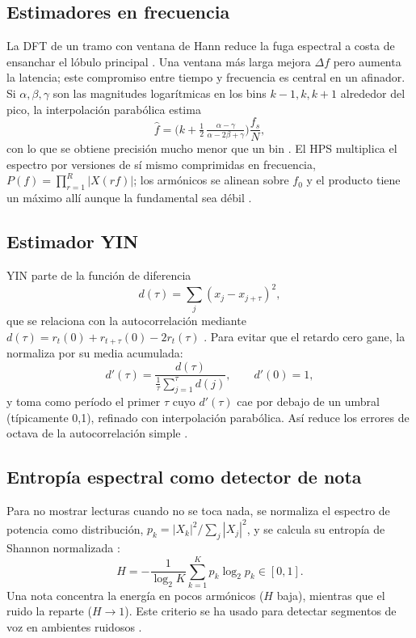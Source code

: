 \documentclass[conference,a4paper]{IEEEtran}
\newcommand{\fo}{f_0}
\begin{document}
\subsection{Estimadores en frecuencia}
La DFT de un tramo con ventana de Hann reduce la fuga espectral a costa de ensanchar el lóbulo principal \parencite{harris1978windows,oppenheim2010discrete}. Una ventana más larga mejora $\Delta f$ pero aumenta la latencia; este compromiso entre tiempo y frecuencia es central en un afinador. Si $\alpha,\beta,\gamma$ son las magnitudes logarítmicas en los bins $k-1,k,k+1$ alrededor del pico, la interpolación parabólica estima
\begin{equation}
\hat f = \Big(k+\tfrac12\,\tfrac{\alpha-\gamma}{\alpha-2\beta+\gamma}\Big)\frac{f_s}{N},
\end{equation}
con lo que se obtiene precisión mucho menor que un bin \parencite{jacobsen2007fast}. El HPS multiplica el espectro por versiones de sí mismo comprimidas en frecuencia, $P(f)=\prod_{r=1}^{R}|X(rf)|$; los armónicos se alinean sobre $\fo$ y el producto tiene un máximo allí aunque la fundamental sea débil \parencite{schroeder1968period,noll1970hps}.

\subsection{Estimador YIN}
YIN parte de la función de diferencia
\begin{equation}
d(\tau)=\sum_{j}(x_j-x_{j+\tau})^2,
\end{equation}
que se relaciona con la autocorrelación mediante $d(\tau)=r_t(0)+r_{t+\tau}(0)-2r_t(\tau)$ \parencite{rabiner1977autocorrelation}. Para evitar que el retardo cero gane, la normaliza por su media acumulada:
\begin{equation}
d'(\tau)=\frac{d(\tau)}{\frac{1}{\tau}\sum_{j=1}^{\tau}d(j)},\qquad d'(0)=1,
\end{equation}
y toma como período el primer $\tau$ cuyo $d'(\tau)$ cae por debajo de un umbral (típicamente 0,1), refinado con interpolación parabólica. Así reduce los errores de octava de la autocorrelación simple \parencite{decheveigne2002yin}.

\subsection{Entropía espectral como detector de nota}
Para no mostrar lecturas cuando no se toca nada, se normaliza el espectro de potencia como distribución, $p_k=|X_k|^2/\sum_j|X_j|^2$, y se calcula su entropía de Shannon normalizada \parencite{shannon1948mathematical}:
\begin{equation}
H=-\frac{1}{\log_2 K}\sum_{k=1}^{K}p_k\log_2 p_k\in[0,1].
\end{equation}
Una nota concentra la energía en pocos armónicos ($H$ baja), mientras que el ruido la reparte ($H\to1$). Este criterio se ha usado para detectar segmentos de voz en ambientes ruidosos \parencite{shen1998entropy}.
\end{document}

